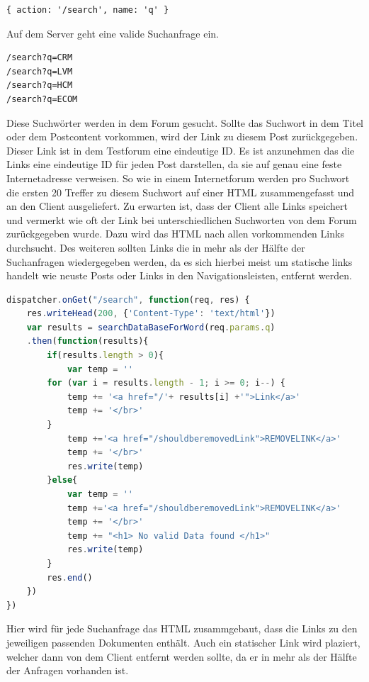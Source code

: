 \begin{lstlisting}[language=HTML5]
{ action: '/search', name: 'q' }
\end{lstlisting}

Auf dem Server geht eine valide Suchanfrage ein.

\begin{lstlisting}[language=HTML5]
/search?q=CRM
/search?q=LVM
/search?q=HCM
/search?q=ECOM
\end{lstlisting}

Diese Suchwörter werden in dem Forum gesucht. Sollte das Suchwort in dem Titel oder dem Postcontent vorkommen, wird der Link zu diesem Post zurückgegeben. Dieser Link ist in dem Testforum eine eindeutige ID. Es ist anzunehmen das die Links eine eindeutige ID für jeden Post darstellen, da sie auf genau eine feste Internetadresse verweisen. So wie in einem Internetforum werden pro Suchwort die ersten 20 Treffer zu diesem Suchwort auf einer HTML zusammengefasst und an den Client ausgeliefert. Zu erwarten ist, dass der Client alle Links speichert und vermerkt wie oft der Link bei unterschiedlichen Suchworten von dem Forum zurückgegeben wurde. Dazu wird das HTML nach allen vorkommenden Links durchsucht. Des weiteren sollten Links die in mehr als der Hälfte der Suchanfragen wiedergegeben werden, da es sich hierbei meist um statische links handelt wie neuste Posts oder Links in den Navigationsleisten, entfernt werden.

\begin{lstlisting}[language=JavaScript]
dispatcher.onGet("/search", function(req, res) {
    res.writeHead(200, {'Content-Type': 'text/html'})
    var results = searchDataBaseForWord(req.params.q)
    .then(function(results){
        if(results.length > 0){
            var temp = ''
        for (var i = results.length - 1; i >= 0; i--) {
            temp += '<a href="/'+ results[i] +'">Link</a>'
            temp += '</br>'
        }
            temp +='<a href="/shouldberemovedLink">REMOVELINK</a>'
            temp += '</br>'
            res.write(temp)
        }else{
            var temp = ''
            temp +='<a href="/shouldberemovedLink">REMOVELINK</a>'
            temp += '</br>'
            temp += "<h1> No valid Data found </h1>"
            res.write(temp)
        }
        res.end()    
    })  
})
\end{lstlisting}

Hier wird für jede Suchanfrage das HTML zusammgebaut, dass die Links zu den jeweiligen passenden Dokumenten enthält.
Auch ein statischer Link wird plaziert, welcher dann von dem Client entfernt werden sollte, da er in mehr als der Hälfte der Anfragen vorhanden ist.

